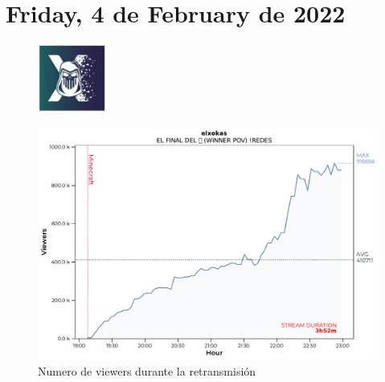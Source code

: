 \documentclass[a4paper,10pt,twoside]{report}
\begin{document}
\section*{Friday, 4 de February de 2022}
\begin{figure}[H]
   \centering
   \includegraphics[width=0.200000\textwidth,left]{report/images/elxokas_profile.jpg}
   \caption*{ }
   \end{figure}
\begin{figure}[H]
   \centering
   \includegraphics[width=1.000000\textwidth,left]{data/elxokas_2022_02_04.pdf}
   \caption*{Numero de viewers durante la retransmisión}
   \end{figure}
\end{document}
